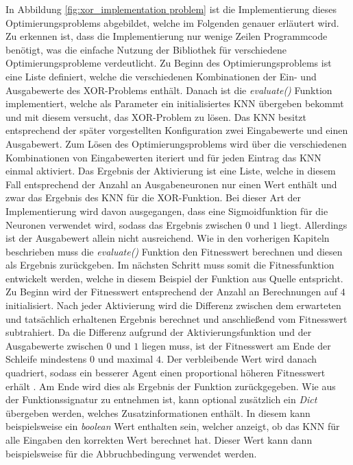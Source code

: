 In Abbildung \ref{fig:xor_implementation problem} ist die Implementierung dieses Optimierungsproblems abgebildet, welche im Folgenden genauer erläutert wird. Zu erkennen ist, dass die Implementierung nur wenige Zeilen Programmcode benötigt, was die einfache Nutzung der Bibliothek für verschiedene Optimierungsprobleme verdeutlicht. Zu Beginn des Optimierungsproblems ist eine Liste definiert, welche die verschiedenen Kombinationen der Ein- und Ausgabewerte des XOR-Problems enthält. Danach ist die \emph{evaluate()} Funktion implementiert, welche als Parameter ein initialisiertes \ac{KNN} übergeben bekommt und mit diesem versucht, das XOR-Problem zu lösen. Das \ac{KNN} besitzt entsprechend der später vorgestellten Konfiguration zwei Eingabewerte und einen Ausgabewert. Zum Lösen des Optimierungsproblems wird über die verschiedenen Kombinationen von Eingabewerten iteriert und für jeden Eintrag das \ac{KNN} einmal aktiviert. Das Ergebnis der Aktivierung ist eine Liste, welche in diesem Fall entsprechend der Anzahl an Ausgabeneuronen nur einen Wert enthält und zwar das Ergebnis des \ac{KNN} für die XOR-Funktion. Bei dieser Art der Implementierung wird davon ausgegangen, dass eine Sigmoidfunktion für die Neuronen verwendet wird, sodass das Ergebnis zwischen $0$ und $1$ liegt. Allerdings ist der Ausgabewert allein nicht ausreichend. Wie in den vorherigen Kapiteln beschrieben muss die \emph{evaluate()} Funktion den Fitnesswert berechnen und diesen als Ergebnis zurückgeben. Im nächsten Schritt muss somit die Fitnessfunktion entwickelt werden, welche in diesem Beispiel der Funktion aus Quelle \cite{stanley2002evolving} entspricht. Zu Beginn wird der Fitnesswert entsprechend der Anzahl an Berechnungen auf $4$ initialisiert. Nach jeder Aktivierung wird die Differenz zwischen dem erwarteten und tatsächlich erhaltenen Ergebnis berechnet und anschließend vom Fitnesswert subtrahiert. Da die Differenz aufgrund der Aktivierungsfunktion und der Ausgabewerte zwischen $0$ und $1$ liegen muss, ist der Fitnesswert am Ende der Schleife mindestens $0$ und maximal $4$. Der verbleibende Wert wird danach quadriert, sodass ein besserer Agent einen proportional höheren Fitnesswert erhält \cite{stanley2002evolving}. Am Ende wird dies als Ergebnis der Funktion zurückgegeben. Wie aus der Funktionssignatur zu entnehmen ist, kann optional zusätzlich ein \emph{Dict} übergeben werden, welches Zusatzinformationen enthält. In diesem kann beispielsweise ein \emph{boolean} Wert enthalten sein, welcher anzeigt, ob das \ac{KNN} für alle Eingaben den korrekten Wert berechnet hat. Dieser Wert kann dann beispielsweise für die Abbruchbedingung verwendet werden.


